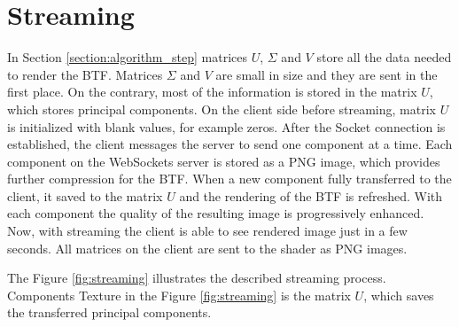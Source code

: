 \chapter{Streaming}
\label{chapter:streaming}



 





In Section \ref{section:algorithm_step} matrices $U$, $\Sigma$ and $V$ store all the data  needed to render the BTF.
Matrices $\Sigma$ and $V$ are small in size and they are sent in the first place. On the contrary, most of the information is stored in the matrix $U$, which stores principal components.
On the client side before streaming, matrix $U$ is initialized with blank values, for example zeros. 
After the Socket connection is established, the client messages the server to send one component at a time. 
 Each component on the WebSockets server is stored as a PNG image, which provides further compression for the BTF.
When a new component fully transferred to the client, it saved to the matrix $U$ and the rendering of the BTF is refreshed.
With each component the quality of the resulting image is progressively enhanced.
Now, with streaming the client is able to see rendered image just in a few seconds.
All matrices on the client are sent to the shader as PNG images.

 The Figure \ref{fig:streaming} illustrates the described streaming process. 
 Components Texture in the Figure \ref{fig:streaming} is the matrix $U$, which saves the transferred principal components.









